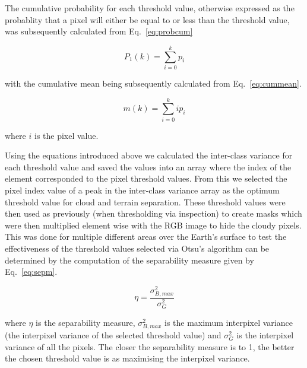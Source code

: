 \par
The cumulative probability for each threshold value, otherwise expressed as the probablity that a pixel will either be equal to or less than the threshold value, was subsequently calculated from Eq.~\ref{eq:probcum}

\begin{equation}\label{eq:probcum}
P_{1}(k)=\sum_{i=0}^{k} p_{i}
\end{equation}


with the cumulative mean being subsequently calculated from Eq.~\ref{eq:cummean}.

\begin{equation}\label{eq:cummean}
m(k)=\sum_{i=0}^{k} i p_{i}
\end{equation}


where $i$ is the pixel value.

Using the equations introduced above we calculated the inter-class variance for each threshold value and saved the values into an array where the index of the element corresponded to the pixel threshold values. From this we selected the pixel index value of a peak in the inter-class variance array as the optimum threshold value for cloud and terrain separation. These threshold values were then used as previously (when thresholding via inspection) to create masks which were then multiplied element wise with the RGB image to hide the cloudy pixels.
This was done for multiple different areas over the Earth's surface to test the effectiveness of the threshold values selected via Otsu's algorithm can be determined by the computation of the separability measure given by Eq.~\ref{eq:sepm}.

\begin{equation}\label{eq:sepm}
    \eta = \frac{\sigma_{B,max}^{2}}{\sigma_{G}^{2}}
\end{equation}


where $\eta$ is the separability measure, $\sigma_{B,max}^{2}$ is the maximum interpixel variance (the interpixel variance of the selected threshold value) and $\sigma_{G}^{2}$ is the interpixel variance of all the pixels. The closer the separability measure is to 1, the better the chosen threshold value is as maximising the interpixel variance.

